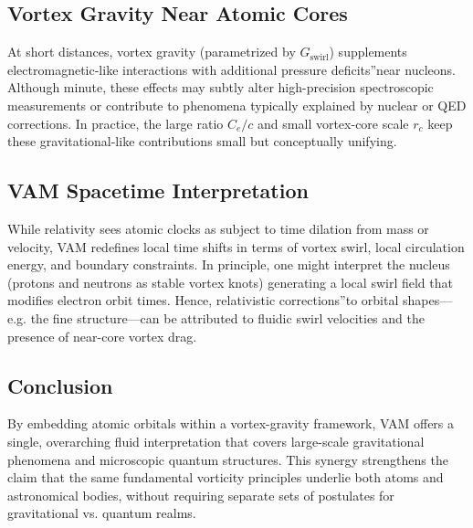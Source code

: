 \subsection{Vortex Gravity Near Atomic Cores}
At short distances, vortex gravity (parametrized by \(G_\text{swirl}\)) supplements electromagnetic-like interactions with additional \grqq pressure deficits\textquotedblright near nucleons. Although minute, these effects may subtly alter high-precision spectroscopic measurements or contribute to phenomena typically explained by nuclear or QED corrections. In practice, the large ratio \(C_e/c\) and small vortex-core scale \(r_c\) keep these gravitational-like contributions small but conceptually unifying.

\subsection{VAM Spacetime Interpretation}
While relativity sees atomic clocks as subject to time dilation from mass or velocity, VAM redefines local time shifts in terms of vortex swirl, local circulation energy, and boundary constraints. In principle, one might interpret the nucleus (protons and neutrons as stable vortex knots) generating a local swirl field that modifies electron orbit times. Hence, \grqq relativistic corrections\textquotedblright to orbital shapes—e.g. the fine structure—can be attributed to fluidic swirl velocities and the presence of near-core vortex drag.

\subsection{Conclusion}
By embedding atomic orbitals within a vortex-gravity framework, VAM offers a single, overarching fluid interpretation that covers large-scale gravitational phenomena and microscopic quantum structures. This synergy strengthens the claim that the same fundamental vorticity principles underlie both atoms and astronomical bodies, without requiring separate sets of postulates for gravitational vs. quantum realms.